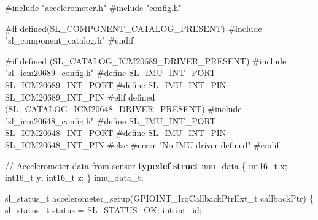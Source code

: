 \documentclass[
  9pt,
  letterpaper,
  abstract,
  titlepage]{scrbook}
\newenvironment{Shaded}{\begin{snugshade}}{\end{snugshade}}
\newcommand{\CommentTok}[1]{\textcolor[rgb]{0.37,0.37,0.37}{#1}}
\newcommand{\DataTypeTok}[1]{\textcolor[rgb]{0.68,0.00,0.00}{#1}}
\newcommand{\ImportTok}[1]{\textcolor[rgb]{0.00,0.46,0.62}{#1}}
\newcommand{\KeywordTok}[1]{\textcolor[rgb]{0.00,0.23,0.31}{\textbf{#1}}}
\newcommand{\NormalTok}[1]{\textcolor[rgb]{0.00,0.23,0.31}{#1}}
\newcommand{\OperatorTok}[1]{\textcolor[rgb]{0.37,0.37,0.37}{#1}}
\newcommand{\PreprocessorTok}[1]{\textcolor[rgb]{0.68,0.00,0.00}{#1}}
\begin{document}
\begin{Shaded}
\begin{Highlighting}[]
\PreprocessorTok{\#include }\ImportTok{"accelerometer.h"}
\PreprocessorTok{\#include }\ImportTok{"config.h"}

\PreprocessorTok{\#if defined(SL\_COMPONENT\_CATALOG\_PRESENT)}
\PreprocessorTok{\#include }\ImportTok{"sl\_component\_catalog.h"}
\PreprocessorTok{\#endif}

\PreprocessorTok{\#if defined (SL\_CATALOG\_ICM20689\_DRIVER\_PRESENT)}
\PreprocessorTok{\#include }\ImportTok{"sl\_icm20689\_config.h"}
\PreprocessorTok{\#define  SL\_IMU\_INT\_PORT SL\_ICM20689\_INT\_PORT}
\PreprocessorTok{\#define  SL\_IMU\_INT\_PIN  SL\_ICM20689\_INT\_PIN}
\PreprocessorTok{\#elif defined (SL\_CATALOG\_ICM20648\_DRIVER\_PRESENT)}
\PreprocessorTok{\#include }\ImportTok{"sl\_icm20648\_config.h"}
\PreprocessorTok{\#define  SL\_IMU\_INT\_PORT SL\_ICM20648\_INT\_PORT}
\PreprocessorTok{\#define  SL\_IMU\_INT\_PIN  SL\_ICM20648\_INT\_PIN}
\PreprocessorTok{\#else}
\PreprocessorTok{\#error "No IMU driver defined"}
\PreprocessorTok{\#endif}

\CommentTok{// Accelerometer data from sensor}
\KeywordTok{typedef} \KeywordTok{struct}\NormalTok{ imu\_data }\OperatorTok{\{}
  \DataTypeTok{int16\_t}\NormalTok{ x}\OperatorTok{;}
  \DataTypeTok{int16\_t}\NormalTok{ y}\OperatorTok{;}
  \DataTypeTok{int16\_t}\NormalTok{ z}\OperatorTok{;}
\OperatorTok{\}}\NormalTok{ imu\_data\_t}\OperatorTok{;}

\NormalTok{sl\_status\_t accelerometer\_setup}\OperatorTok{(}\NormalTok{GPIOINT\_IrqCallbackPtrExt\_t callbackPtr}\OperatorTok{)}
\OperatorTok{\{}
\NormalTok{  sl\_status\_t status }\OperatorTok{=}\NormalTok{ SL\_STATUS\_OK}\OperatorTok{;}
  \DataTypeTok{int}\NormalTok{ int\_id}\OperatorTok{;}


\end{Highlighting}
\end{Shaded}
\end{document}

